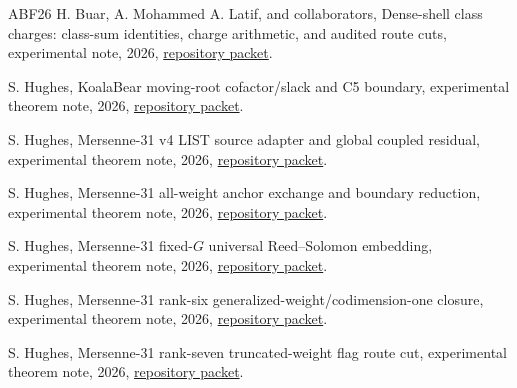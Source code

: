 \documentclass[11pt,a4paper]{amsart}
\numberwithin{equation}{section}
\theoremstyle{remark}
\begin{document}
\begin{thebibliography}{ABF26}
H. Buar, A. Mohammed A. Latif, and collaborators,
\newblock Dense-shell class charges: class-sum identities, charge arithmetic, and audited route cuts,
\newblock experimental note, 2026,
\newblock \href{https://github.com/przchojecki/rs-mca/blob/71f64349a8fa8cbf05678a6e9d4e00e8e06d7de5/experimental/notes/thresholds/dense_shell_class_charges.md}{repository packet}.

S. Hughes,
\newblock KoalaBear moving-root cofactor/slack and C5 boundary,
\newblock experimental theorem note, 2026,
\newblock \href{https://github.com/przchojecki/rs-mca/blob/71f64349a8fa8cbf05678a6e9d4e00e8e06d7de5/experimental/notes/m1/m1_kb_rank9_moving_root_slack_c5_boundary_v1.md}{repository packet}.

S. Hughes,
\newblock Mersenne-31 v4 LIST source adapter and global coupled residual,
\newblock experimental theorem note, 2026,
\newblock \href{https://github.com/przchojecki/rs-mca/blob/71f64349a8fa8cbf05678a6e9d4e00e8e06d7de5/experimental/notes/thresholds/m31_list_v4_source_adapter_global_coupled_residual.md}{repository packet}.

S. Hughes,
\newblock Mersenne-31 all-weight anchor exchange and boundary reduction,
\newblock experimental theorem note, 2026,
\newblock \href{https://github.com/przchojecki/rs-mca/pull/1058}{repository packet}.

S. Hughes,
\newblock Mersenne-31 fixed-$G$ universal Reed--Solomon embedding,
\newblock experimental theorem note, 2026,
\newblock \href{https://github.com/przchojecki/rs-mca/pull/1061}{repository packet}.

S. Hughes,
\newblock Mersenne-31 rank-six generalized-weight/codimension-one closure,
\newblock experimental theorem note, 2026,
\newblock \href{https://github.com/przchojecki/rs-mca/blob/71f64349a8fa8cbf05678a6e9d4e00e8e06d7de5/experimental/notes/thresholds/m31_rank6_generalized_weight_codim_one_closure_v1.md}{repository packet}.

S. Hughes,
\newblock Mersenne-31 rank-seven truncated-weight flag route cut,
\newblock experimental theorem note, 2026,
\newblock \href{https://github.com/przchojecki/rs-mca/blob/71f64349a8fa8cbf05678a6e9d4e00e8e06d7de5/experimental/notes/thresholds/m31_rank7_truncated_weight_flag_route_cut_v1.md}{repository packet}.


\end{thebibliography}
\end{document}
